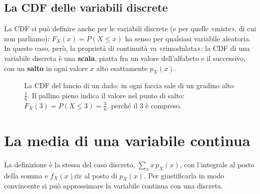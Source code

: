 \subsection{La CDF delle variabili discrete}

La CDF si può definire anche per le variabili discrete (e per quelle «miste», di cui non parliamo): $F_X(x) =
P(X \leq x)$ ha senso per qualsiasi variabile aleatoria. In questo caso, però, la proprietà di continuità va
«rimodulata»: la CDF di una variabile discreta è una \textbf{scala}, piatta fra un valore dell'alfabeto e il successivo,
con un \textbf{salto} in ogni valore $x$ alto esattamente $p_X(x)$.

\begin{figure}[H]
\centering
{}
\caption{La CDF del lancio di un dado: in ogni faccia sale di un gradino alto $\frac16$. Il pallino pieno indica il
valore nel punto di salto: $F_X(3) = P(X \leq 3) = \frac36$, perché il 3 è compreso.}
\end{figure}

\section{La media di una variabile continua}


La definizione è la stessa del caso discreto, $\sum_x x\, p_X(x)$, con l'integrale al posto della somma e
$f_X(x) \dd x$ al posto di $p_X(x)$. Per giustificarla in modo convincente si può approssimare la variabile continua
con una discreta.

